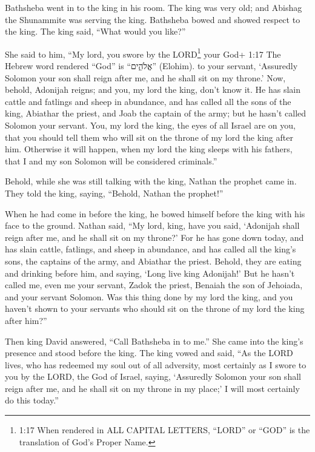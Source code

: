  Bathsheba went in to the king in his room. The king was
very old; and Abishag the Shunammite was serving the king. 
Bathsheba bowed and showed respect to the king. The king said, ``What
would you like?''

 She said to him, ``My lord, you swore by the
LORD\footnote{1:17 When rendered in ALL CAPITAL LETTERS, ``LORD'' or
  ``GOD'' is the translation of God's Proper Name.} your God+ 1:17 The
Hebrew word rendered ``God'' is ``אֱלֹהִ֑ים'' (Elohim). to your servant,
`Assuredly Solomon your son shall reign after me, and he shall sit on my
throne.'  Now, behold, Adonijah reigns; and you, my lord
the king, don't know it.  He has slain cattle and fatlings
and sheep in abundance, and has called all the sons of the king,
Abiathar the priest, and Joab the captain of the army; but he hasn't
called Solomon your servant.  You, my lord the king, the
eyes of all Israel are on you, that you should tell them who will sit on
the throne of my lord the king after him.  Otherwise it
will happen, when my lord the king sleeps with his fathers, that I and
my son Solomon will be considered criminals.''

 Behold, while she was still talking with the king, Nathan
the prophet came in.  They told the king, saying, ``Behold,
Nathan the prophet!''

When he had come in before the king, he bowed himself before the king
with his face to the ground.  Nathan said, ``My lord, king,
have you said, `Adonijah shall reign after me, and he shall sit on my
throne?'  For he has gone down today, and has slain cattle,
fatlings, and sheep in abundance, and has called all the king's sons,
the captains of the army, and Abiathar the priest. Behold, they are
eating and drinking before him, and saying, `Long live king Adonijah!'
 But he hasn't called me, even me your servant, Zadok the
priest, Benaiah the son of Jehoiada, and your servant Solomon.
 Was this thing done by my lord the king, and you haven't
shown to your servants who should sit on the throne of my lord the king
after him?''

 Then king David answered, ``Call Bathsheba in to me.'' She
came into the king's presence and stood before the king. 
The king vowed and said, ``As the LORD lives, who has redeemed my soul
out of all adversity,  most certainly as I swore to you by
the LORD, the God of Israel, saying, `Assuredly Solomon your son shall
reign after me, and he shall sit on my throne in my place;' I will most
certainly do this today.''

